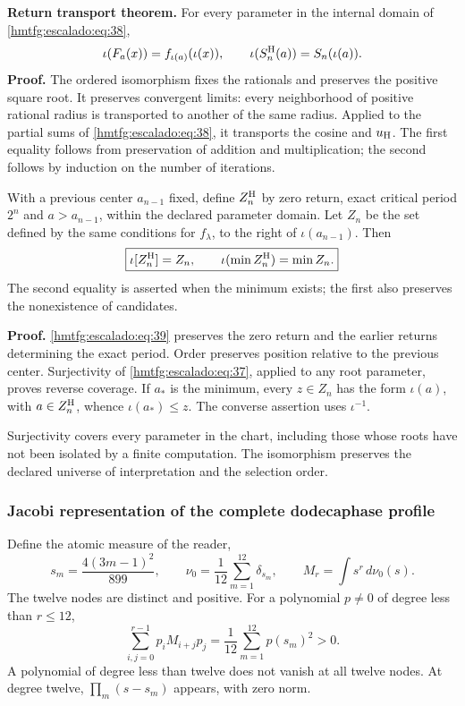 \textbf{Return transport theorem.} For every parameter in the internal domain of \eqref{hmtfg:escalado:eq:38},
\begin{equation}
\iota(F_a(x))=f_{\iota(a)}(\iota(x)),\qquad
\iota(S_n^{\rm H}(a))=S_n(\iota(a)).
\label{hmtfg:escalado:eq:39}
\end{equation}
\textbf{Proof.} The ordered isomorphism fixes the rationals and preserves the positive square root. It preserves convergent limits: every neighborhood of positive rational radius is transported to another of the same radius. Applied to the partial sums of \eqref{hmtfg:escalado:eq:38}, it transports the cosine and \(u_{\rm H}\). The first equality follows from preservation of addition and multiplication; the second follows by induction on the number of iterations.

With a previous center \(a_{n-1}\) fixed, define \(Z_n^{\rm H}\) by zero return, exact critical period \(2^n\) and \(a>a_{n-1}\), within the declared parameter domain. Let \(Z_n\) be the set defined by the same conditions for \(f_\lambda\), to the right of \(\iota(a_{n-1})\). Then
\begin{equation}
\boxed{\iota[Z_n^{\rm H}]=Z_n,\qquad
\iota(\min Z_n^{\rm H})=\min Z_n.}
\label{hmtfg:escalado:eq:40}
\end{equation}
The second equality is asserted when the minimum exists; the first also preserves the nonexistence of candidates.

\textbf{Proof.} \eqref{hmtfg:escalado:eq:39} preserves the zero return and the earlier returns determining the exact period. Order preserves position relative to the previous center. Surjectivity of \eqref{hmtfg:escalado:eq:37}, applied to any root parameter, proves reverse coverage. If \(a_*\) is the minimum, every \(z\in Z_n\) has the form \(\iota(a)\), with \(a\in Z_n^{\rm H}\), whence \(\iota(a_*)\le z\). The converse assertion uses \(\iota^{-1}\).

Surjectivity covers every parameter in the chart, including those whose roots have not been isolated by a finite computation. The isomorphism preserves the declared universe of interpretation and the selection order.

\subsubsection{Jacobi representation of the complete dodecaphase profile}
\label{hmtfg:escalado:14.2}

Define the atomic measure of the reader,
\begin{equation}
s_m=\frac{4(3m-1)^2}{899},\qquad
\nu_0=\frac1{12}\sum_{m=1}^{12}\delta_{s_m},\qquad
M_r=\int s^r\,d\nu_0(s).
\label{hmtfg:escalado:eq:41}
\end{equation}
The twelve nodes are distinct and positive. For a polynomial \(p\ne0\) of degree less than \(r\le12\),
\begin{equation}
\sum_{i,j=0}^{r-1}p_iM_{i+j}p_j
=\frac1{12}\sum_{m=1}^{12}p(s_m)^2>0.
\label{hmtfg:escalado:eq:42}
\end{equation}
A polynomial of degree less than twelve does not vanish at all twelve nodes. At degree twelve, \(\prod_m(s-s_m)\) appears, with zero norm.

